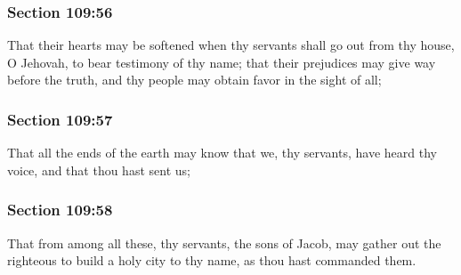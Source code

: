 	\subsubsection{Section 109:56} %
		\label{DC109-56}

		That their hearts may be softened when thy servants shall go out from thy house, O Jehovah, to bear testimony of thy name; that their prejudices may give way before the truth, and thy people may obtain favor in the sight of all;


	\subsubsection{Section 109:57} %
		\label{DC109-57}

		That all the ends of the earth may know that we, thy servants, have heard thy voice, and that thou hast sent us;


	\subsubsection{Section 109:58} %
		\label{DC109-58}

		That from among all these, thy servants, the sons of Jacob, may gather out the righteous to build a holy city to thy name, as thou hast commanded them.


